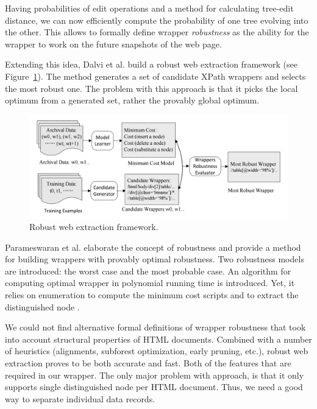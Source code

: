 Having probabilities of edit operations and a method for calculating tree-edit distance, we can now efficiently compute the probability of one tree evolving into the other. This allows to formally define wrapper \emph{robustness} as the ability for the wrapper to work on the future snapshots of the web page. 

Extending this idea, Dalvi et al. \cite{dalvi2009a} build a robust web extraction framework (see Figure~\ref{fig:web-extraction-framework}).  The method generates a set of candidate XPath wrappers and selects the most robust one. The problem with this approach is that it picks the local optimum from a generated set, rather the provably global optimum.

\begin{figure}[h]
	\centering
	\includegraphics[width=\linewidth]{figures/robust-web-extraction-framework}
	\caption{Robust web extraction framework.}
	\label{fig:web-extraction-framework}
\end{figure}

Parameswaran et al. \cite{DBLP:journals/pvldb/ParameswaranDGR11} elaborate the concept of robustness and provide a method for building wrappers with provably optimal robustness. Two robustness models are introduced: the worst case and the most probable case. An algorithm for computing optimal wrapper in polynomial running time is introduced. Yet, it relies on enumeration to compute the minimum cost scripts and to extract the distinguished node \cite{DBLP:conf/wism/LiuWYL12}.

We could not find alternative formal definitions of wrapper robustness that took into account structural properties of HTML documents. Combined with a number of heuristics (alignments, subforest optimization, early pruning, etc.), robust web extraction proves to be both accurate and fast. Both of the features that are required in our wrapper. The only major problem with approach, is that it only supports single distinguished node per HTML document. Thus, we need a good way to separate individual data records.


